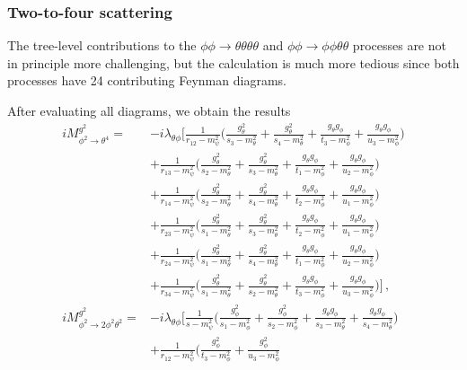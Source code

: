 \documentclass{article}
\numberwithin{equation}{subsection}
\begin{document}
\subsubsection{Two-to-four scattering}

The tree-level contributions to the $\phi\phi\to \theta\theta\theta\theta$ and $\phi\phi\to\phi\phi\theta\theta$ processes are
not in principle more challenging, but the calculation is much more tedious since both processes have 24 contributing Feynman
diagrams.

After evaluating all diagrams, we obtain the results
\begin{align*}
 i M^{g^2}_{\phi^2\to\theta^4} =& - i\lambda_{\theta\phi}\Bigg[\frac{1}{r_{12} - m_\psi^2}\Bigg(
	\frac{g_\theta^2}{s_3 - m_\theta^2} + \frac{g_\theta^2}{s_4 - m_\theta^2}
	+ \frac{g_\theta g_\phi}{t_3 - m_\phi^2} + \frac{g_\theta g_\phi}{u_3 - m_\phi^2}\Bigg)\\[0.5em]
 & + \frac{1}{r_{13} - m_\psi^2}\Bigg(
	\frac{g_\theta^2}{s_2 - m_\theta^2} + \frac{g_\theta^2}{s_3 - m_\theta^2}
	+ \frac{g_\theta g_\phi}{t_1 - m_\phi^2} + \frac{g_\theta g_\phi}{u_2 - m_\phi^2}\Bigg)\\[0.5em]
 & + \frac{1}{r_{14} - m_\psi^2}\Bigg(
	\frac{g_\theta^2}{s_2 - m_\theta^2} + \frac{g_\theta^2}{s_4 - m_\theta^2}
	+ \frac{g_\theta g_\phi}{t_2 - m_\phi^2} + \frac{g_\theta g_\phi}{u_1 - m_\phi^2}\Bigg)\\[0.5em]
 & + \frac{1}{r_{23} - m_\psi^2}\Bigg(
	\frac{g_\theta^2}{s_1 - m_\theta^2} + \frac{g_\theta^2}{s_3 - m_\theta^2}
	+ \frac{g_\theta g_\phi}{t_2 - m_\phi^2} + \frac{g_\theta g_\phi}{u_1 - m_\phi^2}\Bigg)\\[0.5em]
 & + \frac{1}{r_{24} - m_\psi^2}\Bigg(
	\frac{g_\theta^2}{s_1 - m_\theta^2} + \frac{g_\theta^2}{s_4 - m_\theta^2}
	+ \frac{g_\theta g_\phi}{t_1 - m_\phi^2} + \frac{g_\theta g_\phi}{u_2 - m_\phi^2}\Bigg)\\[0.5em]
 & + \frac{1}{r_{34} - m_\psi^2}\Bigg(
	\frac{g_\theta^2}{s_1 - m_\theta^2} + \frac{g_\theta^2}{s_2 - m_\theta^2}
	+ \frac{g_\theta g_\phi}{t_3 - m_\phi^2} + \frac{g_\theta g_\phi}{u_3 - m_\phi^2}\Bigg)
\Bigg]\,, \\[0.5em]
 i M^{g^2}_{\phi^2\to 2\phi^2\theta^2} =& -i\lambda_{\theta\phi}\Bigg[
  \frac{1}{s - m_\psi^2}\Bigg(
	\frac{g_\phi^2}{s_1 - m_\phi^2} + \frac{g_\phi^2}{s_2 - m_\phi^2}
	+ \frac{g_\theta g_\phi}{s_3 - m_\theta^2} + \frac{g_\theta g_\phi}{s_4 - m_\theta^2}\Bigg)
	\\[0.5em]
  &+ \frac{1}{r_{12} - m_\psi^2}\Bigg(
	\frac{g_\phi^2}{t_3 - m_\phi^2} + \frac{g_\phi^2}{u_3 - m_\phi^2}

\end{align*}
\end{document}
